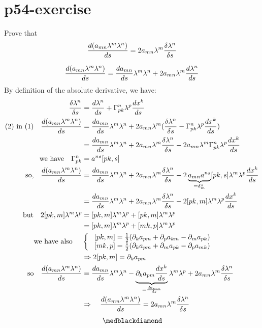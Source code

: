 \section{p54-exercise}
\begin{tcolorbox}
Prove that $$\dv{(a_{mn}\lambda^m\lambda^n)}{s} = 2 a_{mn}\lambda^m \frac{\delta\lambda^n}{\delta s}$$
\end{tcolorbox}
\begin{align} \dv{(a_{mn}\lambda^m\lambda^n)}{s}= \dv{a_{mn}}{s}\lambda^m\lambda^n+2a_{mn}\lambda^m \dv{\lambda^n}{s}
\end{align}
By definition of the absolute derivative, we have:
\begin{align}
\frac{\delta \lambda^n}{\delta s}& =\dv{\lambda ^n}{s}  + \Gamma^n_{pk}\lambda^p\dv{x^k}{s} \\
\text{(2) in (1)}\quad \dv{(a_{mn}\lambda^m\lambda^n)}{s}&= \dv{a_{mn}}{s}\lambda^m\lambda^n+2a_{mn}\lambda^m (\frac{\delta \lambda^n}{\delta s} - \Gamma^n_{pk}\lambda^p\dv{x^k}{s})\\
\ &= \dv{a_{mn}}{s}\lambda^m\lambda^n+2a_{mn}\lambda^m \frac{\delta \lambda^n}{\delta s} - 2a_{mn}\lambda^m \Gamma^n_{pk}\lambda^p\dv{x^k}{s}\\
\text{we have} \quad \Gamma^n_{pk} &= a^{ns}[pk,s]\\
\text{so,} \quad \dv{(a_{mn}\lambda^m\lambda^n)}{s}&= \dv{a_{mn}}{s}\lambda^m\lambda^n+2a_{mn}\lambda^m \frac{\delta \lambda^n}{\delta s} - 2\underbrace{a_{mn}a^{ns}}_{=\delta^s_m}[pk,s]\lambda^m \lambda^p\dv{x^k}{s}\\
&= \dv{a_{mn}}{s}\lambda^m\lambda^n+2a_{mn}\lambda^m \frac{\delta \lambda^n}{\delta s} - 2[pk,m]\lambda^m \lambda^p\dv{x^k}{s}\\
\text{but} \quad 2[pk,m]\lambda^m\lambda^p &= [pk,m]\lambda^m\lambda^p+[pk,m]\lambda^m\lambda^p\\
&= [pk,m]\lambda^m\lambda^p+[mk,p]\lambda^m\lambda^p\\
\text{we have also }\quad &\left \{ \begin{array}{c}
\ [pk,m] = \frac{1}{2}(\partial _k a_{pm} + \partial _p a_{km}-\partial _m a_{pk})\\
\ [mk,p] = \frac{1}{2}(\partial _k a_{pm} + \partial _m a_{pk}-\partial _p a_{mk})\\
\end{array}\right.\\
\ &\Rightarrow 2[pk,m] = \partial _k a_{pm}\\
\text{so} \quad \dv{(a_{mn}\lambda^m\lambda^n)}{s} &= \dv{a_{mn}}{s}\lambda^m\lambda^n - \underbrace{ \partial _k a_{pm}\dv{x^k}{s}}_{=\dv{a_{mn}}{s}} \lambda^m \lambda^p +2a_{mn}\lambda^m \frac{\delta \lambda^n}{\delta s} \\
\ & \Rightarrow \quad  \dv{(a_{mn}\lambda^m\lambda^n)}{s} = 2a_{mn}\lambda^m \frac{\delta \lambda^n}{\delta s} 
\end{align} 
$$\medblackdiamond$$
\newpage

